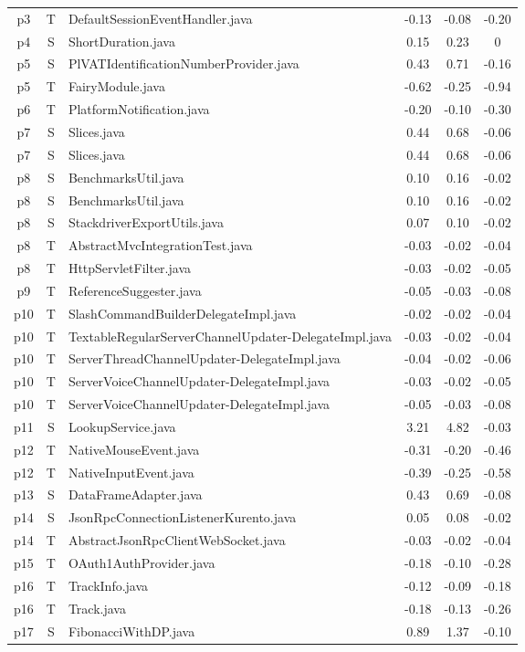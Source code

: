 \begin{longtable}{ccp{5.1cm}ccc@{}}
  p3 & T & DefaultSessionEventHandler.java & -0.13 & -0.08 & -0.20 \\
  p4 & S & ShortDuration.java & 0.15 & 0.23 & 0 \\
  p5 & S & PlVATIdentificationNumberProvider.java & 0.43 & 0.71 & -0.16 \\
  p5 & T & FairyModule.java & -0.62 & -0.25 & -0.94 \\
  p6 & T & PlatformNotification.java & -0.20 & -0.10 & -0.30 \\
  p7 & S & Slices.java & 0.44 & 0.68 & -0.06 \\
  p7 & S & Slices.java & 0.44 & 0.68 & -0.06 \\
  p8 & S & BenchmarksUtil.java & 0.10 & 0.16 & -0.02 \\
  p8 & S & BenchmarksUtil.java & 0.10 & 0.16 & -0.02 \\
  p8 & S & StackdriverExportUtils.java & 0.07 & 0.10 & -0.02 \\
  p8 & T & AbstractMvcIntegrationTest.java & -0.03 & -0.02 & -0.04 \\
  p8 & T & HttpServletFilter.java & -0.03 & -0.02 & -0.05 \\
  p9 & T & ReferenceSuggester.java & -0.05 & -0.03 & -0.08 \\
  p10 & T & SlashCommandBuilderDelegateImpl.java & -0.02 & -0.02 & -0.04 \\
  p10 & T & TextableRegularServerChannelUpdater-DelegateImpl.java & -0.03 & -0.02 & -0.04 \\
  p10 & T & ServerThreadChannelUpdater-DelegateImpl.java & -0.04 & -0.02 & -0.06 \\
  p10 & T & ServerVoiceChannelUpdater-DelegateImpl.java & -0.03 & -0.02 & -0.05 \\
  p10 & T & ServerVoiceChannelUpdater-DelegateImpl.java & -0.05 & -0.03 & -0.08 \\
  p11 & S & LookupService.java & 3.21 & 4.82 & -0.03 \\
  p12 & T & NativeMouseEvent.java & -0.31 & -0.20 & -0.46 \\
  p12 & T & NativeInputEvent.java & -0.39 & -0.25 & -0.58 \\
  p13 & S & DataFrameAdapter.java & 0.43 & 0.69 & -0.08 \\
  p14 & S & JsonRpcConnectionListenerKurento.java & 0.05 & 0.08 & -0.02 \\
  p14 & T & AbstractJsonRpcClientWebSocket.java & -0.03 & -0.02 & -0.04 \\
  p15 & T & OAuth1AuthProvider.java & -0.18 & -0.10 & -0.28 \\
  p16 & T & TrackInfo.java & -0.12 & -0.09 & -0.18 \\
  p16 & T & Track.java & -0.18 & -0.13 & -0.26 \\
  p17 & S & FibonacciWithDP.java & 0.89 & 1.37 & -0.10 \\
  \bottomrule
\end{longtable}
\FloatBarrier